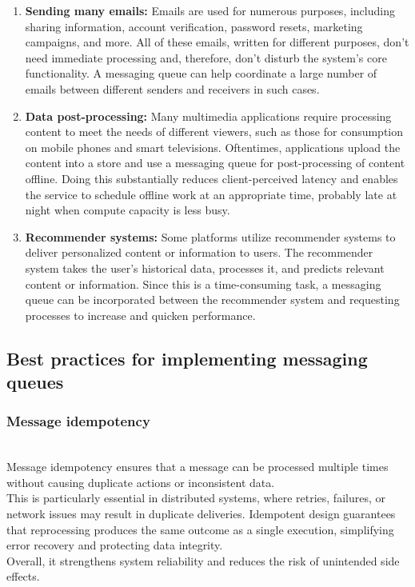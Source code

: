 \begin{enumerate}
\item
\protect{}\label{qzsvP7fTOzBRPcSsfht22}
\textbf{Sending many emails:} Emails are used for numerous purposes, including sharing information, account verification, password resets, marketing campaigns, and more. All of these emails, written for different purposes, don't need immediate processing and, therefore, don't disturb the system's core functionality. A messaging queue can help coordinate a large number of emails between different senders and receivers in such cases.
\item
\protect{}\label{tTOl85J5SfTbqe_-FpKRe}
\textbf{Data post-processing:} Many multimedia applications require processing content to meet the needs of different viewers, such as those for consumption on mobile phones and smart televisions. Oftentimes, applications upload the content into a store and use a messaging queue for post-processing of content offline. Doing this substantially reduces client-perceived latency and enables the service to schedule offline work at an appropriate time, probably late at night when compute capacity is less busy.
\item
\protect{}\label{TchH_Ib-WldJTMR-LGv4U}
\textbf{Recommender systems:} Some platforms utilize recommender systems to deliver personalized content or information to users. The recommender system takes the user's historical data, processes it, and predicts relevant content or information. Since this is a time-consuming task, a messaging queue can be incorporated between the recommender system and requesting processes to increase and quicken performance.
\end{enumerate}

\subsection{Best practices for implementing messaging queues}\label{l5ZkqNpOI0C1B82gBWXX1}

\subsubsection{Message idempotency}\label{OM3PB-YxQ9x8rwyEOF_wp}
\\
Message idempotency ensures that a message can be processed multiple times without causing duplicate actions or inconsistent data.
\\
This is particularly essential in distributed systems, where retries, failures, or network issues may result in duplicate deliveries. Idempotent design guarantees that reprocessing produces the same outcome as a single execution, simplifying error recovery and protecting data integrity.
\\
Overall, it strengthens system reliability and reduces the risk of unintended side effects.

